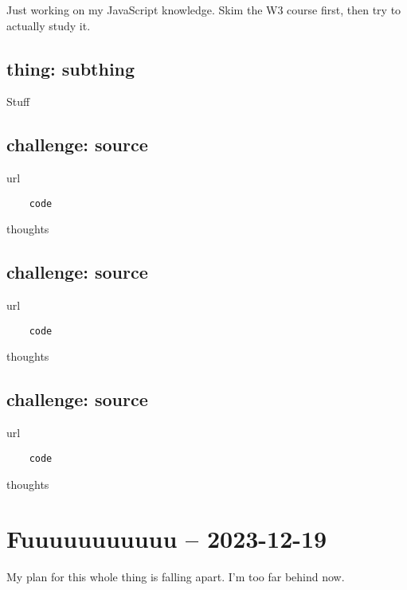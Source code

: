 \documentclass[
	letterpaper, %
	12pt, %
]{CSSullivanBusinessReport}
\begin{document}
Just working on my JavaScript knowledge. Skim the W3 course first, then try to actually study it.


\subsection[thing]{thing: subthing}

Stuff



\subsection[Challenge]{challenge: source}

url

\begin{verbatim}
	code
\end{verbatim}

thoughts


\subsection[Challenge]{challenge: source}

url

\begin{verbatim}
	code
\end{verbatim}

thoughts


\subsection[Challenge]{challenge: source}

url

\begin{verbatim}
	code
\end{verbatim}

thoughts


\section[19 Dec: Fuck]{Fuuuuuuuuuuu -- 2023-12-19} %

My plan for this whole thing is falling apart. I'm too far behind now. 
\end{document}
